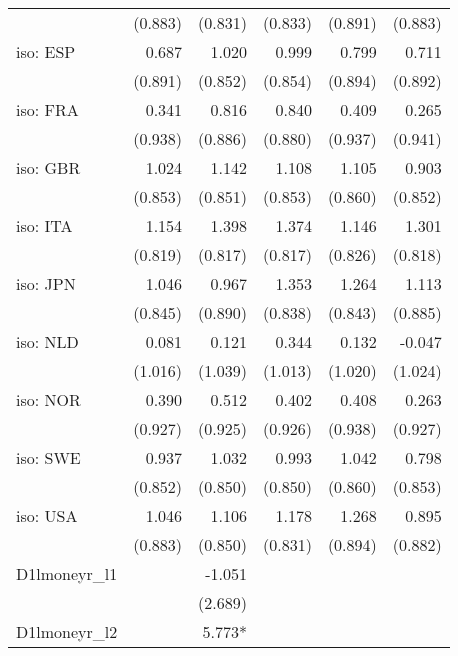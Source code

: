 \begin{tabular}{lrrrrr}
                  &   (0.883) &   (0.831) &   (0.833) &   (0.891) &   (0.883) \\ 
iso: ESP          &     0.687 &     1.020 &     0.999 &     0.799 &     0.711 \\ 
                  &   (0.891) &   (0.852) &   (0.854) &   (0.894) &   (0.892) \\ 
iso: FRA          &     0.341 &     0.816 &     0.840 &     0.409 &     0.265 \\ 
                  &   (0.938) &   (0.886) &   (0.880) &   (0.937) &   (0.941) \\ 
iso: GBR          &     1.024 &     1.142 &     1.108 &     1.105 &     0.903 \\ 
                  &   (0.853) &   (0.851) &   (0.853) &   (0.860) &   (0.852) \\ 
iso: ITA          &     1.154 &     1.398 &     1.374 &     1.146 &     1.301 \\ 
                  &   (0.819) &   (0.817) &   (0.817) &   (0.826) &   (0.818) \\ 
iso: JPN          &     1.046 &     0.967 &     1.353 &     1.264 &     1.113 \\ 
                  &   (0.845) &   (0.890) &   (0.838) &   (0.843) &   (0.885) \\ 
iso: NLD          &     0.081 &     0.121 &     0.344 &     0.132 &    -0.047 \\ 
                  &   (1.016) &   (1.039) &   (1.013) &   (1.020) &   (1.024) \\ 
iso: NOR          &     0.390 &     0.512 &     0.402 &     0.408 &     0.263 \\ 
                  &   (0.927) &   (0.925) &   (0.926) &   (0.938) &   (0.927) \\ 
iso: SWE          &     0.937 &     1.032 &     0.993 &     1.042 &     0.798 \\ 
                  &   (0.852) &   (0.850) &   (0.850) &   (0.860) &   (0.853) \\ 
iso: USA          &     1.046 &     1.106 &     1.178 &     1.268 &     0.895 \\ 
                  &   (0.883) &   (0.850) &   (0.831) &   (0.894) &   (0.882) \\ 
D1lmoneyr\_l1     &           &    -1.051 &           &           &           \\ 
                  &           &   (2.689) &           &           &           \\ 
D1lmoneyr\_l2     &           &    5.773* &           &           &           \\ 

\end{tabular}
